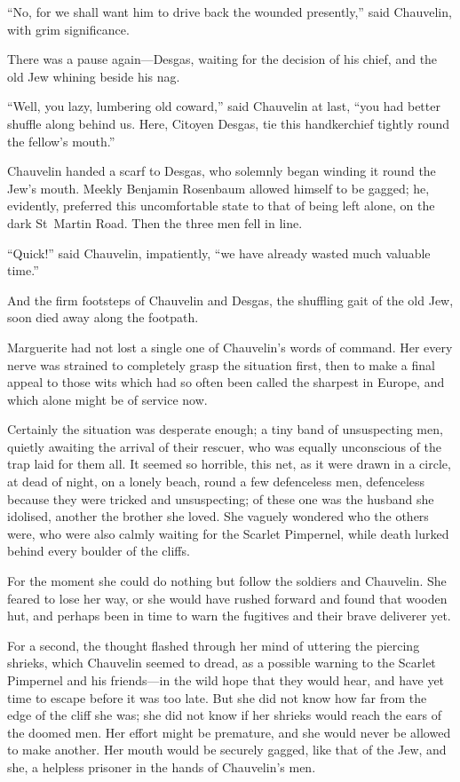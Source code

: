 \enquote{No, for we shall want him to drive back the wounded presently,} said Chauvelin, with grim significance.

There was a pause again---Desgas, waiting for the decision of his chief, and the old Jew whining beside his nag.

\enquote{Well, you lazy, lumbering old coward,} said Chauvelin at last, \enquote{you had better shuffle along behind us. Here, Citoyen Desgas, tie this handkerchief tightly round the fellow's mouth.}

Chauvelin handed a scarf to Desgas, who solemnly began winding it round the Jew's mouth. Meekly Benjamin Rosenbaum allowed himself to be gagged; he, evidently, preferred this uncomfortable state to that of being left alone, on the dark St~Martin Road. Then the three men fell in line.

\enquote{Quick!} said Chauvelin, impatiently, \enquote{we have already wasted much valuable time.}

And the firm footsteps of Chauvelin and Desgas, the shuffling gait of the old Jew, soon died away along the footpath.

Marguerite had not lost a single one of Chauvelin's words of command. Her every nerve was strained to completely grasp the situation first, then to make a final appeal to those wits which had so often been called the sharpest in Europe, and which alone might be of service now.

Certainly the situation was desperate enough; a tiny band of unsuspecting men, quietly awaiting the arrival of their rescuer, who was equally unconscious of the trap laid for them all. It seemed so horrible, this net, as it were drawn in a circle, at dead of night, on a lonely beach, round a few defenceless men, defenceless because they were tricked and unsuspecting; of these one was the husband she idolised, another the brother she loved. She vaguely wondered who the others were, who were also calmly waiting for the Scarlet Pimpernel, while death lurked behind every boulder of the cliffs.

For the moment she could do nothing but follow the soldiers and Chauvelin. She feared to lose her way, or she would have rushed forward and found that wooden hut, and perhaps been in time to warn the fugitives and their brave deliverer yet.

For a second, the thought flashed through her mind of uttering the piercing shrieks, which Chauvelin seemed to dread, as a possible warning to the Scarlet Pimpernel and his friends---in the wild hope that they would hear, and have yet time to escape before it was too late. But she did not know how far from the edge of the cliff she was; she did not know if her shrieks would reach the ears of the doomed men. Her effort might be premature, and she would never be allowed to make another. Her mouth would be securely gagged, like that of the Jew, and she, a helpless prisoner in the hands of Chauvelin's men.

